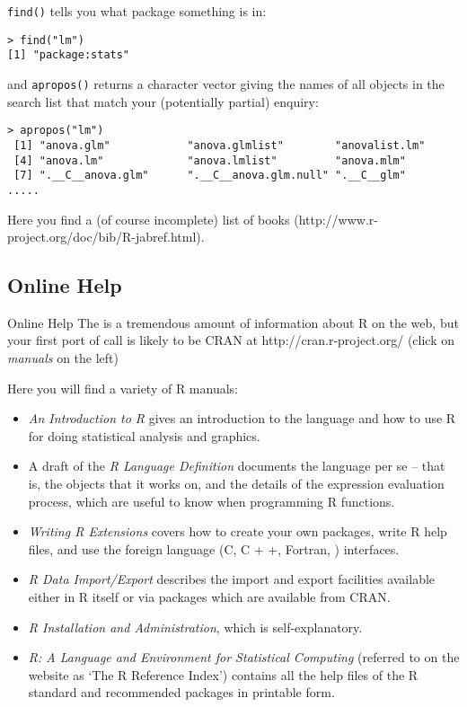 \documentclass[12pt]{article}
\begin{document}
\texttt{find()} tells you what package something is in:
\begin{verbatim}
> find("lm")
[1] "package:stats"
\end{verbatim}

and \texttt{apropos()} returns a character vector giving the names of all objects in the search list that match your (potentially partial) enquiry:

\begin{verbatim}
> apropos("lm")
 [1] "anova.glm"            "anova.glmlist"        "anovalist.lm"        
 [4] "anova.lm"             "anova.lmlist"         "anova.mlm"           
 [7] ".__C__anova.glm"      ".__C__anova.glm.null" ".__C__glm"     
.....
\end{verbatim}

Here you find a (of course incomplete) list of books (http://www.r-project.org/doc/bib/R-jabref.html). 

\subsection{Online Help}
Online Help
The is a tremendous amount of information about R on the web, but your first port of call is likely to be CRAN at http://cran.r-project.org/ (click on \emph{manuals} on the left)

Here you will find a variety of R manuals:
\begin{itemize}
\item \emph{An Introduction to R} gives an introduction to the language and how to use R for doing
statistical analysis and graphics.
\item A draft of the \emph{R Language Definition} documents the language per se – that is, the objects
that it works on, and the details of the expression evaluation process, which are useful
to know when programming R functions.
\item \emph{Writing R Extensions} covers how to create your own packages, write R help files, and
use the foreign language (C, C + +, Fortran,
) interfaces.
\item \emph{R Data Import/Export} describes the import and export facilities available either in R
itself or via packages which are available from CRAN.
\item \emph{R Installation and Administration}, which is self-explanatory.
\item \emph{R: A Language and Environment for Statistical Computing} (referred to on the website as
‘The R Reference Index’) contains all the help files of the R standard and recommended packages in printable form.
\end{itemize}
\end{document}
